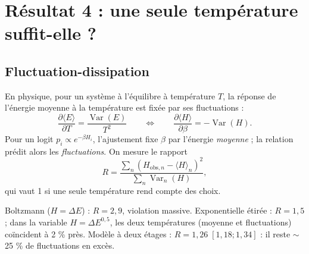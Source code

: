 \documentclass[11pt,a4paper]{article}
\newcommand{\DE}{\Delta E}
\begin{document}
\section{Résultat 4 : une seule température suffit-elle ?}

\subsection{Fluctuation-dissipation}
En physique, pour un système à l'équilibre à température $T$, la réponse de l'énergie moyenne à la température
est fixée par ses fluctuations :
\begin{equation}
  \frac{\partial \langle E\rangle}{\partial T} = \frac{\operatorname{Var}(E)}{T^2}
  \qquad\Longleftrightarrow\qquad
  \frac{\partial \langle H\rangle}{\partial \beta} = -\operatorname{Var}(H) .
\end{equation}
Pour un logit $p_i \propto e^{-\beta H_i}$, l'ajustement fixe $\beta$ par l'énergie \emph{moyenne} ; la relation
prédit alors les \emph{fluctuations}. On mesure le rapport
\begin{equation}
  R = \frac{\sum_n \left(H_{\text{obs},n} - \langle H\rangle_n\right)^2}{\sum_n \operatorname{Var}_n(H)} ,
\end{equation}
qui vaut 1 si une seule température rend compte des choix.

\begin{resultat}
Boltzmann ($H = \DE$) : $R = 2{,}9$, violation massive. Exponentielle étirée : $R = 1{,}5$ ; dans la variable
$H = \DE^{0{,}5}$, les deux températures (moyenne et fluctuations) coïncident à 2 \% près. Modèle à deux
étages : $R = 1{,}26\;[1{,}18 ; 1{,}34]$ : il reste $\sim$25 \% de fluctuations en excès.
\end{resultat}
\end{document}
